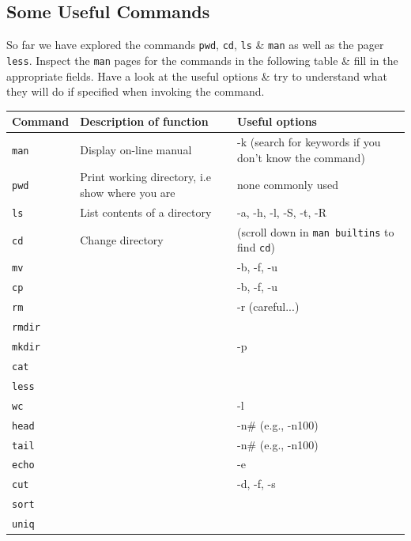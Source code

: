 \subsection{Some Useful Commands}
\begin{steps}
So far we have explored the commands \texttt{pwd}, \texttt{cd}, \texttt{ls} \& \texttt{man} as well as the pager \texttt{less}.
Inspect the \texttt{man} pages for the commands in the following table  \& fill in the appropriate fields.
Have a look at the useful options \& try to understand what they will do if specified when invoking the command. \\

\begin{center}
\renewcommand{\arraystretch}{1.6}
\begin{tabular}{|p{2cm} | p{8.5cm} | p{4.5cm}|}
\hline
\textbf{Command} & \textbf{Description of function} & \textbf{Useful options} \\ \hline
\texttt{man} & Display on-line manual & -k (search for keywords if you don't know the command) \\ \hline
\texttt{pwd} & Print working directory, i.e show where you are & none commonly used \\ \hline
\texttt{ls} & List contents of a directory & -a, -h, -l, -S, -t, -R \\ \hline
\texttt{cd} & Change directory & (scroll down in \texttt{man builtins} to find \texttt{cd}) \\ \hline
\texttt{mv} & & -b, -f, -u \\ \hline
\texttt{cp} & & -b, -f, -u \\ \hline
\texttt{rm} & & -r (careful...) \\ \hline
\texttt{rmdir} & & \\ \hline
\texttt{mkdir} & & -p\\ \hline
\texttt{cat} & & \\ \hline
\texttt{less} & & \\ \hline
\texttt{wc} & & -l \\ \hline
\texttt{head} & & -n\# (e.g., -n100) \\ \hline
\texttt{tail} & & -n\# (e.g., -n100) \\ \hline
\texttt{echo} & &  -e\\ \hline
\texttt{cut} & & -d, -f, -s \\ \hline
\texttt{sort} & & \\ \hline
\texttt{uniq} & & \\ \hline
\end{tabular}
\end{center}
\end{steps}

